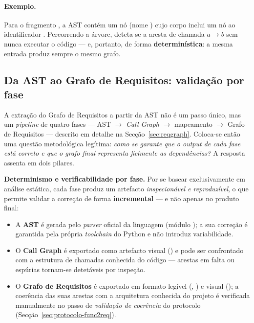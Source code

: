 \paragraph{Exemplo.} Para o fragmento , a
AST contém um nó  (nome ) cujo corpo inclui
um nó  ao identificador . Percorrendo a árvore,
deteta-se a aresta de chamada $a \rightarrow b$ sem nunca executar o
código --- e, portanto, de forma \textbf{determinística}: a mesma
entrada produz sempre o mesmo grafo.

\subsection{Da AST ao Grafo de Requisitos: validação por fase}
\label{sec:ast-validacao}

A extração do Grafo de Requisitos a partir da AST não é um passo
único, mas um \emph{pipeline} de quatro fases ---
AST $\rightarrow$ \emph{Call Graph} $\rightarrow$ mapeamento
 $\rightarrow$ Grafo de Requisitos --- descrito em
detalhe na Secção~\ref{sec:reqgraph}. Coloca-se então uma questão
metodológica legítima: \emph{como se garante que o output de cada fase
está correto e que o grafo final representa fielmente as
dependências?} A resposta assenta em dois pilares.

\textbf{Determinismo e verificabilidade por fase.} Por se basear
exclusivamente em análise estática, cada fase produz um artefacto
\emph{inspecionável e reproduzível}, o que permite validar a correção
de forma \textbf{incremental} --- e não apenas no produto final:
\begin{itemize}
    \item A \textbf{AST} é gerada pelo \emph{parser} oficial da
        linguagem (módulo ); a sua correção é garantida pela
        própria \emph{toolchain} do Python e não introduz
        variabilidade.
    \item O \textbf{Call Graph} é exportado como artefacto visual
        () e pode ser confrontado com a
        estrutura de chamadas conhecida do código --- arestas em falta
        ou espúrias tornam-se detetáveis por inspeção.
    \item O \textbf{Grafo de Requisitos} é exportado em formato
        legível (, ) e
        visual (); a coerência das suas arestas
        com a arquitetura conhecida do projeto é verificada
        manualmente no passo de \emph{validação de coerência} do
        protocolo (Secção~\ref{sec:protocolo-func2req}).
\end{itemize}

